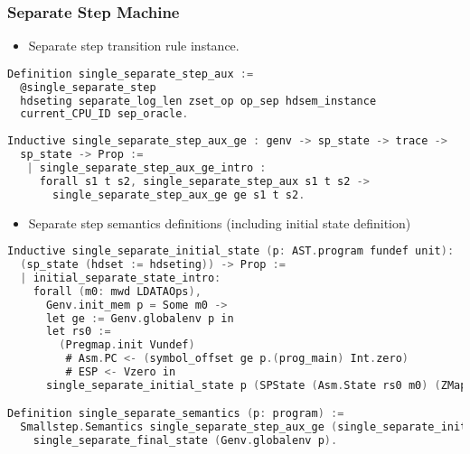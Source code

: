 %
%

\subsubsection{Separate Step Machine}
\begin{itemize}[leftmargin=*]
\item Separate step transition rule instance.
\end{itemize}
\begin{lstlisting}[language=C]
Definition single_separate_step_aux :=
  @single_separate_step
  hdseting separate_log_len zset_op op_sep hdsem_instance
  current_CPU_ID sep_oracle.
    
Inductive single_separate_step_aux_ge : genv -> sp_state -> trace -> 
  sp_state -> Prop :=
   | single_separate_step_aux_ge_intro : 
     forall s1 t s2, single_separate_step_aux s1 t s2 -> 
       single_separate_step_aux_ge ge s1 t s2.
\end{lstlisting}

\begin{itemize}[leftmargin=*]
\item Separate step semantics definitions (including initial state definition)
\end{itemize}
\begin{lstlisting}[language=C]
Inductive single_separate_initial_state (p: AST.program fundef unit): 
  (sp_state (hdset := hdseting)) -> Prop :=
  | initial_separate_state_intro: 
    forall (m0: mwd LDATAOps),
      Genv.init_mem p = Some m0 ->
      let ge := Genv.globalenv p in
      let rs0 :=
        (Pregmap.init Vundef)
         # Asm.PC <- (symbol_offset ge p.(prog_main) Int.zero)
         # ESP <- Vzero in
      single_separate_initial_state p (SPState (Asm.State rs0 m0) (ZMap.init nil)).

Definition single_separate_semantics (p: program) :=
  Smallstep.Semantics single_separate_step_aux_ge (single_separate_initial_state p) 
    single_separate_final_state (Genv.globalenv p).
\end{lstlisting}